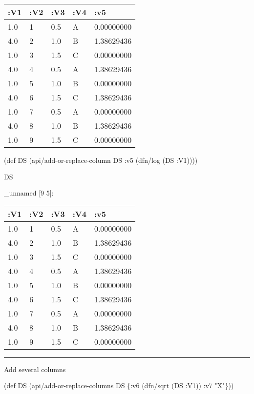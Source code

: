 \documentclass[]{article}
\newenvironment{Shaded}{\begin{snugshade}}{\end{snugshade}}
\newcommand{\AttributeTok}[1]{\textcolor[rgb]{0.77,0.63,0.00}{#1}}
\newcommand{\BuiltInTok}[1]{#1}
\newcommand{\FunctionTok}[1]{\textcolor[rgb]{0.00,0.00,0.00}{#1}}
\newcommand{\NormalTok}[1]{#1}
\newcommand{\StringTok}[1]{\textcolor[rgb]{0.31,0.60,0.02}{#1}}
\begin{document}
\begin{longtable}[]{@{}lllll@{}}
\toprule
:V1 & :V2 & :V3 & :V4 & :v5\tabularnewline
\midrule
\endhead
1.0 & 1 & 0.5 & A & 0.00000000\tabularnewline
4.0 & 2 & 1.0 & B & 1.38629436\tabularnewline
1.0 & 3 & 1.5 & C & 0.00000000\tabularnewline
4.0 & 4 & 0.5 & A & 1.38629436\tabularnewline
1.0 & 5 & 1.0 & B & 0.00000000\tabularnewline
4.0 & 6 & 1.5 & C & 1.38629436\tabularnewline
1.0 & 7 & 0.5 & A & 0.00000000\tabularnewline
4.0 & 8 & 1.0 & B & 1.38629436\tabularnewline
1.0 & 9 & 1.5 & C & 0.00000000\tabularnewline
\bottomrule
\end{longtable}

\begin{Shaded}
\begin{Highlighting}[]
\NormalTok{(}\BuiltInTok{def}\FunctionTok{ DS }\NormalTok{(api/add-or-replace-column DS }\AttributeTok{:v5}\NormalTok{ (dfn/log (DS }\AttributeTok{:V1}\NormalTok{))))}
\end{Highlighting}
\end{Shaded}

\begin{Shaded}
\begin{Highlighting}[]
\NormalTok{DS}
\end{Highlighting}
\end{Shaded}

\_unnamed {[}9 5{]}:

\begin{longtable}[]{@{}lllll@{}}
\toprule
:V1 & :V2 & :V3 & :V4 & :v5\tabularnewline
\midrule
\endhead
1.0 & 1 & 0.5 & A & 0.00000000\tabularnewline
4.0 & 2 & 1.0 & B & 1.38629436\tabularnewline
1.0 & 3 & 1.5 & C & 0.00000000\tabularnewline
4.0 & 4 & 0.5 & A & 1.38629436\tabularnewline
1.0 & 5 & 1.0 & B & 0.00000000\tabularnewline
4.0 & 6 & 1.5 & C & 1.38629436\tabularnewline
1.0 & 7 & 0.5 & A & 0.00000000\tabularnewline
4.0 & 8 & 1.0 & B & 1.38629436\tabularnewline
1.0 & 9 & 1.5 & C & 0.00000000\tabularnewline
\bottomrule
\end{longtable}

\begin{center}\rule{0.5\linewidth}{0.5pt}\end{center}

Add several columns

\begin{Shaded}
\begin{Highlighting}[]
\NormalTok{(}\BuiltInTok{def}\FunctionTok{ DS }\NormalTok{(api/add-or-replace-columns DS \{}\AttributeTok{:v6}\NormalTok{ (dfn/sqrt (DS }\AttributeTok{:V1}\NormalTok{))}
                                       \AttributeTok{:v7} \StringTok{"X"}\NormalTok{\}))}
\end{Highlighting}
\end{Shaded}
\end{document}
